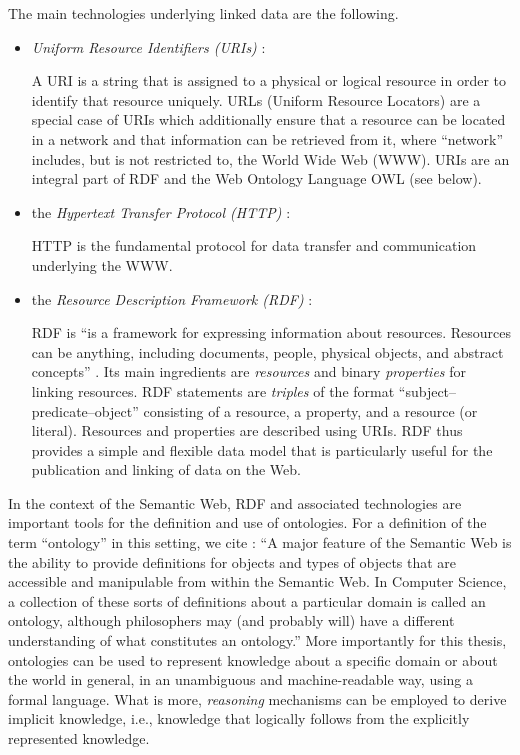 The main technologies underlying linked data are the following.
%
\begin{itemize}
  \item
    \emph{Uniform Resource Identifiers (URIs)} \autocite{RFC3986}:
    
    \par
    A URI is a string that is assigned to a physical or logical resource
    in order to identify that resource uniquely. URLs (Uniform Resource Locators)
    are a special case of URIs which additionally ensure that a resource
    can be located in a network and that information can be retrieved from it,
    where \enquote{network} includes, but is not restricted to, the World Wide Web (WWW).
    URIs are an integral part of RDF and the Web Ontology Language OWL (see below).
  \item
    the \emph{Hypertext Transfer Protocol (HTTP)} \autocite{HTTP}:
    
    \par
    HTTP is the fundamental protocol for data transfer and communication underlying the WWW.
  \item
    the \emph{Resource Description Framework (RDF)} \autocite{RDFPrimer}:
    
    \par
    RDF is \enquote{is a framework for expressing information about resources. Resources can be anything, including documents, people, physical objects, and abstract concepts}
    \autocite{RDFPrimer}.
    Its main ingredients are \emph{resources} and binary \emph{properties} for linking resources.
    RDF statements are \emph{triples} of the format \enquote{subject--predicate--object}
    consisting of a resource, a property, and a resource (or literal).
    Resources and properties are described using URIs.
    RDF thus provides a simple and flexible data model that is particularly useful for the publication
    and linking of data on the Web.
\end{itemize}
%
In the context of the Semantic Web, RDF and associated technologies
are important tools for the definition and use of ontologies.
For a definition of the term \enquote{ontology} in this setting, we cite \textcite{Horrocks2011}:
\enquote{A major feature of the Semantic Web is the ability to provide definitions for objects and types of objects that are accessible and manipulable from within the Semantic Web. In Computer Science, a collection of these sorts of definitions about a particular domain is called an ontology, although philosophers may (and probably will) have a different understanding of what constitutes an ontology.}
More importantly for this thesis, ontologies can be used to represent knowledge about a specific domain
or about the world in general, in an unambiguous and machine-readable way, using a formal language.
What is more, \emph{reasoning} mechanisms can be employed to derive implicit knowledge,
i.e., knowledge that logically follows from the explicitly represented knowledge.

